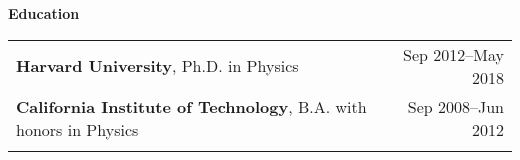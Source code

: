 \documentclass[letterpaper,11pt,oneside]{article}
\begin{document}

 \vspace{0.1cm}
\raggedright
\normalsize
\begin{flushleft}
 \textbf{\Large{Education}} \sout{\hfill} \\
\vspace{0.5cm}
\begin{tabular}{@{} l r@{}}
     \textbf{Harvard University}, Ph.D. in Physics & Sep 2012--May 2018 \\
     \textbf{California Institute of Technology}, B.A. with honors in  Physics & Sep 2008--Jun 2012\\
     \hspace{0.78\linewidth} & \hspace{0.1\linewidth} \\
\end{tabular}
\end{flushleft}




\clearpage
\end{document}
